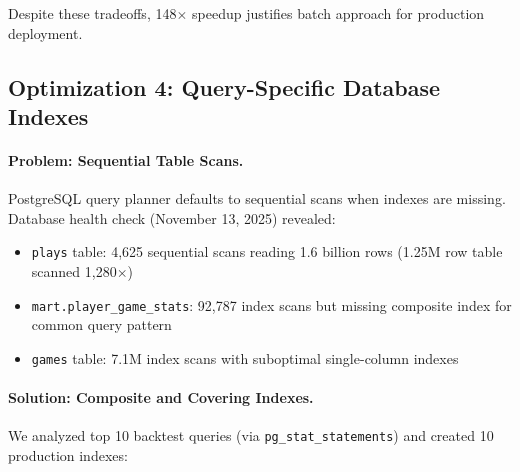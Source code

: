 Despite these tradeoffs, 148$\times$ speedup justifies batch approach for production deployment.

\subsection{Optimization 4: Query-Specific Database Indexes}

\paragraph{Problem: Sequential Table Scans.}
PostgreSQL query planner defaults to sequential scans when indexes are missing. Database health check (November 13, 2025) revealed:

\begin{itemize}[itemsep=2pt,parsep=0pt]
    \item \texttt{plays} table: 4,625 sequential scans reading 1.6 billion rows (1.25M row table scanned 1,280$\times$)
    \item \texttt{mart.player\_game\_stats}: 92,787 index scans but missing composite index for common query pattern
    \item \texttt{games} table: 7.1M index scans with suboptimal single-column indexes
\end{itemize}

\paragraph{Solution: Composite and Covering Indexes.}
We analyzed top 10 backtest queries (via \texttt{pg\_stat\_statements}) and created 10 production indexes:

